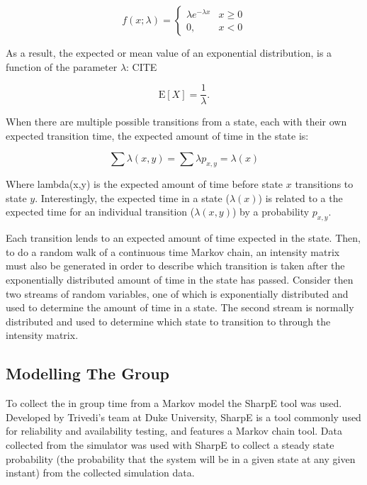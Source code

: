\begin{equation}
f(x;\lambda) = \begin{cases}
\lambda e^{-\lambda x} & x \ge 0 \\
0, & x < 0
\end{cases}
\end{equation}

As a result, the expected or mean value of an exponential distribution, is a function of
the parameter $\lambda$: CITE

\begin{equation}
\mathrm{E}[X] = \frac{1}{\lambda}. \!
\end{equation}

When there are multiple possible transitions from a state, each with their own
expected transition time, the expected amount of time in the state is:

\begin{equation}
\sum \lambda(x,y) = \sum \lambda p_{x,y} = \lambda(x)
\end{equation}

Where lambda(x,y) is the expected amount of time before state $x$ transitions to
state $y$. Interestingly, the expected time in a state ($\lambda(x)$) is related
to a the expected time for an individual transition ($\lambda(x,y)$) by a probability
$p_{x,y}$.

Each transition lends to an expected amount of time expected in the state. Then,
to do a random walk of a continuous time Markov chain, an intensity matrix must
also be generated in order to describe which transition is taken after the
exponentially distributed amount of time in the state has passed. Consider then
two streams of random variables, one of which is exponentially distributed and
used to determine the amount of time in a state. The second stream is normally
distributed and used to determine which state to transition to through the
intensity matrix.

\subsection{Modelling The Group}

To collect the in group time from a Markov model the SharpE tool was used.
Developed by Trivedi's team at Duke University, SharpE is a tool commonly used
for reliability and availability testing, and features a Markov chain tool. Data
collected from the simulator was used with SharpE to collect a steady state
probability (the probability that the system will be in a given state at any
given instant) from the collected simulation data.

